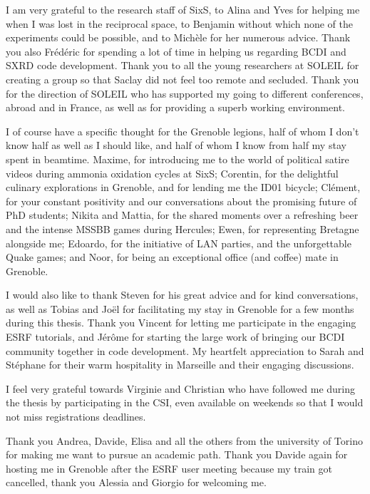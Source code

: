 I am very grateful to the research staff of SixS, to Alina and Yves for helping me when I was lost in the reciprocal space, to Benjamin without which none of the experiments could be possible, and to Michèle for her numerous advice.
Thank you also Frédéric for spending a lot of time in helping us regarding BCDI and SXRD code development.
Thank you to all the young researchers at SOLEIL for creating a group so that Saclay did not feel too remote and secluded.
Thank you for the direction of SOLEIL who has supported my going to different conferences, abroad and in France, as well as for providing a superb working environment.

I of course have a specific thought for the Grenoble legions, half of whom I don't know half as well as I should like, and half of whom I know from half my stay spent in beamtime.
Maxime, for introducing me to the world of political satire videos during ammonia oxidation cycles at SixS; Corentin, for the delightful culinary explorations in Grenoble, and for lending me the ID01 bicycle; Clément, for your constant positivity and our conversations about the promising future of PhD students; Nikita and Mattia, for the shared moments over a refreshing beer and the intense MSSBB games during Hercules; Ewen, for representing Bretagne alongside me; Edoardo, for the initiative of LAN parties, and the unforgettable Quake games; and Noor, for being an exceptional office (and coffee) mate in Grenoble.

I would also like to thank Steven for his great advice and for kind conversations, as well as Tobias and Joël for facilitating my stay in Grenoble for a few months during this thesis.
Thank you Vincent for letting me participate in the engaging ESRF tutorials, and Jérôme for starting the large work of bringing our BCDI community together in code development.
My heartfelt appreciation to Sarah and Stéphane for their warm hospitality in Marseille and their engaging discussions.

I feel very grateful towards Virginie and Christian who have followed me during the thesis by participating in the CSI, even available on weekends so that I would not miss registrations deadlines.

Thank you Andrea, Davide, Elisa and all the others from the university of Torino for making me want to pursue an academic path.
Thank you Davide again for hosting me in Grenoble after the ESRF user meeting because my train got cancelled, thank you Alessia and Giorgio for welcoming me.

